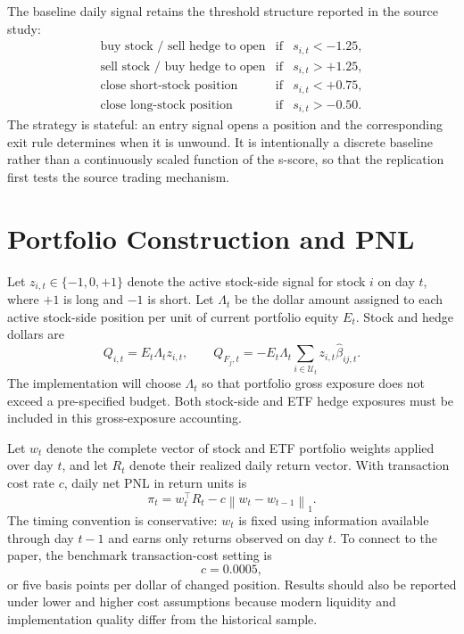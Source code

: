 \documentclass[11pt]{article}
\begin{document}
The baseline daily signal retains the threshold structure reported in the
source study:
\[
\begin{array}{lll}
    \text{buy stock / sell hedge to open} & \text{if} & s_{i,t} < -1.25,\\
    \text{sell stock / buy hedge to open} & \text{if} & s_{i,t} > +1.25,\\
    \text{close short-stock position} & \text{if} & s_{i,t} < +0.75,\\
    \text{close long-stock position} & \text{if} & s_{i,t} > -0.50.
\end{array}
\]
The strategy is stateful: an entry signal opens a position and the
corresponding exit rule determines when it is unwound. It is intentionally a
discrete baseline rather than a continuously scaled function of the s-score,
so that the replication first tests the source trading mechanism.

\section{Portfolio Construction and PNL}

Let $z_{i,t}\in\{-1,0,+1\}$ denote the active stock-side signal for stock $i$
on day $t$, where $+1$ is long and $-1$ is short. Let $\Lambda_t$ be the
dollar amount assigned to each active stock-side position per unit of current
portfolio equity $E_t$. Stock and hedge dollars are
\[
    Q_{i,t}=E_t\Lambda_t z_{i,t},
    \qquad
    Q_{F_j,t}
    =
    -E_t\Lambda_t
    \sum_{i\in\mathcal{U}_t}z_{i,t}\widehat{\beta}_{ij,t}.
\]
The implementation will choose $\Lambda_t$ so that portfolio gross exposure
does not exceed a pre-specified budget. Both stock-side and ETF hedge
exposures must be included in this gross-exposure accounting.

Let $w_t$ denote the complete vector of stock and ETF portfolio weights
applied over day $t$, and let $R_t$ denote their realized daily return vector.
With transaction cost rate $c$, daily net PNL in return units is
\[
    \pi_t
    =
    w_t^{\top}R_t
    -
    c\left\|w_t-w_{t-1}\right\|_1.
\]
The timing convention is conservative: $w_t$ is fixed using information
available through day $t-1$ and earns only returns observed on day $t$. To
connect to the paper, the benchmark transaction-cost setting is
\[
    c = 0.0005,
\]
or five basis points per dollar of changed position. Results should also be
reported under lower and higher cost assumptions because modern liquidity and
implementation quality differ from the historical sample.
\end{document}
